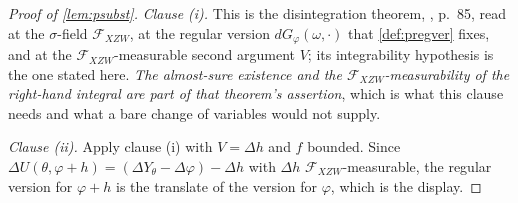 \begin{proof}[Proof of \cref{lem:psubst}]
\emph{Clause (i).} This is the disintegration theorem, \citet[Thm.~5.4]{kallenberg1997}, p.~85, read at
the $\sigma$-field $\mathcal F_{XZW}$, at the regular version $dG_\varphi(\omega,\cdot)$ that
\cref{def:pregver} fixes, and at the $\mathcal F_{XZW}$-measurable second argument $V$; its integrability
hypothesis is the one stated here. \emph{The almost-sure existence and the
$\mathcal F_{XZW}$-measurability of the right-hand integral are part of that theorem's assertion}, which
is what this clause needs and what a bare change of variables would not supply.

\emph{Clause (ii).} Apply clause (i) with $V=\Delta h$ and $f$ bounded. Since
$\Delta U(\theta,\varphi+h)=(\Delta Y_\theta-\Delta\varphi)-\Delta h$ with $\Delta h$
$\mathcal F_{XZW}$-measurable, the regular version for $\varphi+h$ is the translate of the version for
$\varphi$, which is the display.
\end{proof}

